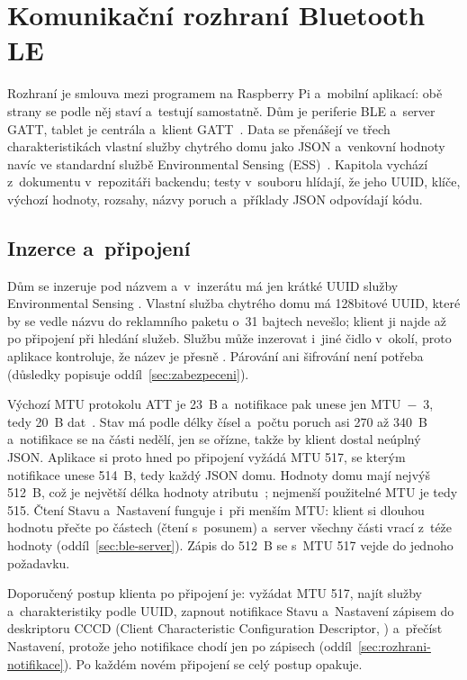 \chapter{Komunikační rozhraní Bluetooth LE}
\label{chap:rozhrani}

Rozhraní je smlouva mezi programem na Raspberry Pi a~mobilní aplikací: obě strany se podle něj
staví a~testují samostatně. Dům je periferie BLE a~server GATT, tablet je centrála a~klient
GATT~\cite{bt-core}. Data se přenášejí ve třech charakteristikách vlastní služby chytrého domu jako JSON
a~venkovní hodnoty navíc ve standardní službě Environmental Sensing (ESS)~\cite{bt-ess}. Kapitola
vychází z~dokumentu  v~repozitáři backendu; testy v~souboru
 hlídají, že jeho UUID, klíče, výchozí hodnoty, rozsahy, názvy
poruch a~příklady JSON odpovídají kódu.

\section{Inzerce a~připojení}
\label{sec:rozhrani-pripojeni}

Dům se inzeruje pod názvem  a~v~inzerátu má jen krátké UUID služby
Environmental Sensing . Vlastní služba chytrého domu má 128bitové UUID, které by se vedle
názvu do reklamního paketu o~31 bajtech nevešlo; klient ji najde až po připojení při hledání
služeb. Službu  může inzerovat i~jiné čidlo v~okolí, proto aplikace kontroluje, že
název je přesně . Párování ani šifrování není potřeba (důsledky popisuje
oddíl~\ref{sec:zabezpeceni}).

Výchozí MTU protokolu ATT je 23~B a~notifikace pak unese jen MTU~$-$~3, tedy 20~B
dat~\cite{bt-core}. Stav má podle délky čísel a~počtu poruch asi 270 až 340~B a~notifikace se na
části nedělí, jen se ořízne, takže by klient dostal neúplný JSON. Aplikace si proto hned po
připojení vyžádá MTU 517, se kterým notifikace unese 514~B, tedy každý JSON domu. Hodnoty
domu mají nejvýš 512~B, což je největší délka hodnoty atributu~\cite{bt-core}; nejmenší
použitelné MTU je tedy 515. Čtení Stavu a~Nastavení funguje i~při menším MTU: klient si dlouhou
hodnotu přečte po částech (čtení s~posunem) a~server všechny části vrací z~téže hodnoty
(oddíl~\ref{sec:ble-server}). Zápis do 512~B se s~MTU 517 vejde do jednoho požadavku.

Doporučený postup klienta po připojení je: vyžádat MTU 517, najít služby a~charakteristiky podle
UUID, zapnout notifikace Stavu a~Nastavení zápisem do deskriptoru CCCD (Client Characteristic
Configuration Descriptor, ) a~přečíst Nastavení, protože jeho notifikace chodí jen
po zápisech (oddíl~\ref{sec:rozhrani-notifikace}). Po každém novém připojení se celý postup
opakuje.

